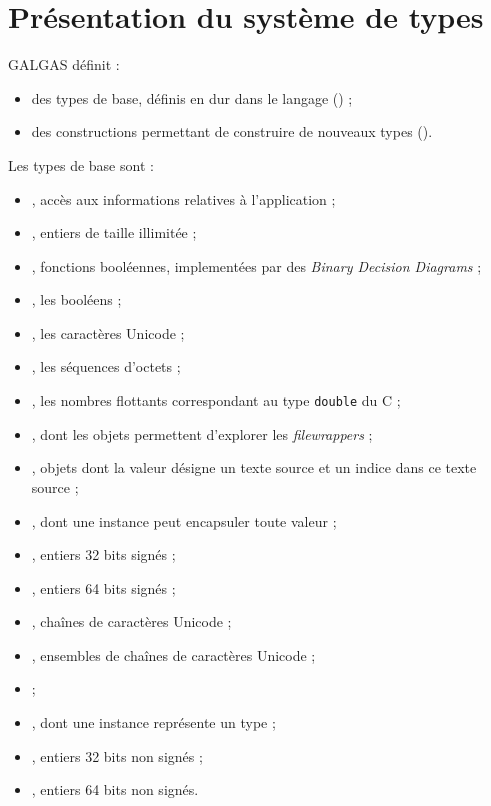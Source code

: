 
\chapter{Présentation du système de types}

\tableDesMatieresDuChapitre


GALGAS définit :
\begin{itemize}
\item des types de base, définis en dur dans le langage () ;
\item des constructions permettant de construire de nouveaux types ().
\end{itemize}





Les types de base sont :
\begin{itemize}
\item {}, accès aux informations relatives à l'application ;
\item {}, entiers de taille illimitée ;
\item {}, fonctions booléennes, implementées par des \emph{Binary Decision Diagrams} ;
\item {}, les booléens ;
\item {}, les caractères Unicode ;
\item {}, les séquences d'octets ;
\item {}, les nombres flottants correspondant au type \texttt{double} du C ;
\item {}, dont les objets permettent d'explorer les \emph{filewrappers} ;
\item {}, objets dont la valeur désigne un texte source et un indice dans ce texte source ;
\item {}, dont une instance peut encapsuler toute valeur ;
\item {}, entiers 32 bits signés ;
\item {}, entiers 64 bits signés ;
\item {}, chaînes de caractères Unicode ;
\item {}, ensembles de chaînes de caractères Unicode ;
\item {} ;
\item {}, dont une instance représente un type ;
\item {}, entiers 32 bits non signés ;
\item {}, entiers 64 bits non signés.
\end{itemize}






